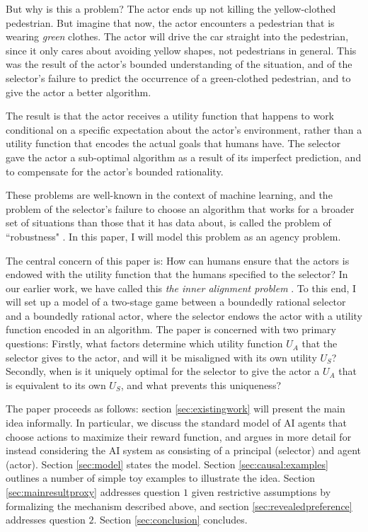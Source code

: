 But why is this a problem? The actor ends up not killing the yellow-clothed pedestrian. But imagine that now, the actor encounters a pedestrian that is wearing \textit{green} clothes. The actor will drive the car straight into the pedestrian, since it only cares about avoiding yellow shapes, not pedestrians in general. This was the result of the actor's bounded understanding of the situation, and of the selector's failure to predict the occurrence of a green-clothed pedestrian, and to give the actor a better algorithm. 

The result is that the actor receives a utility function that happens to work conditional on a specific expectation about the actor's environment, rather than a utility function that encodes the actual goals that humans have. The selector gave the actor a sub-optimal algorithm as a result of its imperfect prediction, and to compensate for the actor's bounded rationality.

These problems are well-known in the context of machine learning, and the problem of the selector's failure to choose an algorithm that works for a broader set of situations than those that it has data about, is called the problem of ``robustness" \citep{Amodei2016}. In this paper, I will model this problem as an agency problem.

The central concern of this paper is: How can humans ensure that the actors is endowed with the utility function that the humans specified to the selector? In our earlier work, we have called this \textit{the inner alignment problem} \citep{Hubinger2019}. To this end, I will set up a model of a two-stage game between a boundedly rational selector and a boundedly rational actor, where the selector endows the actor with a utility function encoded in an algorithm. The paper is concerned with two primary questions: Firstly, what factors determine which utility function $U_A$ that the selector gives to the actor, and will it be misaligned with its own utility $U_S$? Secondly, when is it uniquely optimal for the selector to give the actor a $U_A$ that is equivalent to its own $U_S$, and what prevents this uniqueness?

\medskip

\noindent The paper proceeds as follows: section \ref{sec:existingwork} will present the main idea informally. In particular, we discuss the standard model of AI agents that choose actions to maximize their reward function, and argues in more detail for instead considering the AI system as consisting of a principal (selector) and agent (actor). Section \ref{sec:model} states the model. Section \ref{sec:causal:examples} outlines a number of simple toy examples to illustrate the idea. Section \ref{sec:mainresultproxy} addresses question $1$ given restrictive assumptions by formalizing the mechanism described above, and section \ref{sec:revealedpreference} addresses question $2$. Section \ref{sec:conclusion} concludes.
